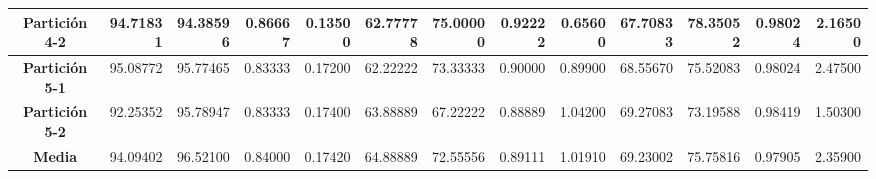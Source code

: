 \documentclass[a4paper,11pt]{article}
\begin{document}
\begin{table}[H]
\begin{adjustbox}{width=1.1\textwidth}
\begin{tabular}{|c|r|r|r|r|r|r|r|r|r|r|r|r|}
    \textbf{Partición 4-2} & 94.71831 & 94.38596 & 0.86667 & 0.13500 & 62.77778 & 75.00000 & 0.92222 & 0.65600 & 67.70833 & 78.35052 & 0.98024 & 2.16500 \\ \hline
    \textbf{Partición 5-1} & 95.08772 & 95.77465 & 0.83333 & 0.17200 & 62.22222 & 73.33333 & 0.90000 & 0.89900 & 68.55670 & 75.52083 & 0.98024 & 2.47500 \\ \hline
    \textbf{Partición 5-2} & 92.25352 & 95.78947 & 0.83333 & 0.17400 & 63.88889 & 67.22222 & 0.88889 & 1.04200 & 69.27083 & 73.19588 & 0.98419 & 1.50300 \\ \hline
    \textbf{Media} & 94.09402 & 96.52100 & 0.84000 & 0.17420 & 64.88889 & 72.55556 & 0.89111 & 1.01910 & 69.23002 & 75.75816 & 0.97905 & 2.35900 \\ \hline
    \end{tabular}
    \end{adjustbox}
    \label{SFS}
  \end{table}
  
\end{document}
